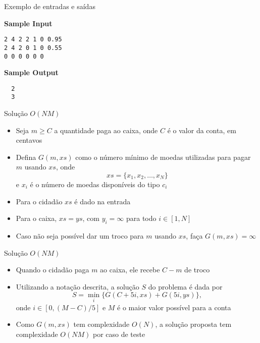\begin{frame}[fragile]{Exemplo de entradas e saídas}

\begin{minipage}[t]{0.45\textwidth}
\textbf{Sample Input}
\begin{verbatim}
2 4 2 2 1 0 0.95
2 4 2 0 1 0 0.55
0 0 0 0 0 0
\end{verbatim}
\end{minipage}
\begin{minipage}[t]{0.5\textwidth}
\textbf{Sample Output}
\begin{verbatim}
  2
  3
\end{verbatim}
\end{minipage}
\end{frame}

\begin{frame}[fragile]{Solução $O(NM)$}

   \begin{itemize}
        \item Seja $m \geq C$ a quantidade paga ao caixa, onde $C$ é o valor da conta, em centavos

        \item Defina $G(m, xs)$ como o número mínimo de moedas utilizadas para pagar $m$ usando
            $xs$, onde
        \[
            xs = \{ x_1, x_2, \ldots, x_N \}
        \]
        e $x_i$ é o número de moedas disponíveis do tipo $c_i$
    
        \item Para o cidadão $xs$ é dado na entrada

        \item Para o caixa, $xs = ys$, com $y_i = \infty$ para todo $i\in [1, N]$

        \item Caso não seja possível dar um troco para $m$ usando $xs$, faça $G(m, xs) = \infty$
   \end{itemize}

\end{frame}

\begin{frame}[fragile]{Solução $O(NM)$}

    \begin{itemize}
        \item Quando o cidadão paga $m$ ao caixa, ele recebe $C - m$ de troco

        \item Utilizando a notação descrita, a solução $S$ do problema é dada por
        \[
            S = \min_i\{ G(C + 5i, xs) + G(5i, ys) \},
        \]
        onde $i\in [0, (M - C)/5]$ e $M$ é o maior valor possível para a conta

        \item Como $G(m, xs)$ tem complexidade $O(N)$, a solução proposta tem complexidade 
            $O(NM)$ por caso de teste
    \end{itemize}

\end{frame}


